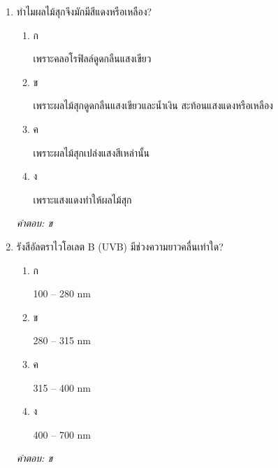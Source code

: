 \documentclass[12pt]{article}
\begin{document}
\begin{enumerate}[label=\arabic*., itemsep=0.5\baselineskip, topsep=0.5\baselineskip, leftmargin=*]
\item ทำไมผลไม้สุกจึงมักมีสีแดงหรือเหลือง?
\begin{enumerate}[label=\alph*)., itemsep=0.3\baselineskip, topsep=0.3\baselineskip]
\item ก\ 
\begin{minipage}[t]{0.9\linewidth}
\raggedright เพราะคลอโรฟิลล์ดูดกลืนแสงเขียว
\end{minipage}
\item ข\ 
\begin{minipage}[t]{0.9\linewidth}
\raggedright เพราะผลไม้สุกดูดกลืนแสงเขียวและน้ำเงิน สะท้อนแสงแดงหรือเหลือง
\end{minipage}
\item ค\ 
\begin{minipage}[t]{0.9\linewidth}
\raggedright เพราะผลไม้สุกเปล่งแสงสีเหล่านั้น
\end{minipage}
\item ง\ 
\begin{minipage}[t]{0.9\linewidth}
\raggedright เพราะแสงแดงทำให้ผลไม้สุก
\end{minipage}
\end{enumerate}
\vspace{-0.3\baselineskip}
\begin{small}
\textit{คำตอบ: ข}
\end{small}

\item รังสีอัลตราไวโอเลต B (UVB) มีช่วงความยาวคลื่นเท่าใด?
\begin{enumerate}[label=\alph*)., itemsep=0.3\baselineskip, topsep=0.3\baselineskip]
\item ก\ 
\begin{minipage}[t]{0.9\linewidth}
\raggedright 100 – 280 nm
\end{minipage}
\item ข\ 
\begin{minipage}[t]{0.9\linewidth}
\raggedright 280 – 315 nm
\end{minipage}
\item ค\ 
\begin{minipage}[t]{0.9\linewidth}
\raggedright 315 – 400 nm
\end{minipage}
\item ง\ 
\begin{minipage}[t]{0.9\linewidth}
\raggedright 400 – 700 nm
\end{minipage}
\end{enumerate}
\vspace{-0.3\baselineskip}
\begin{small}
\textit{คำตอบ: ข}
\end{small}


\end{enumerate}
\end{document}
